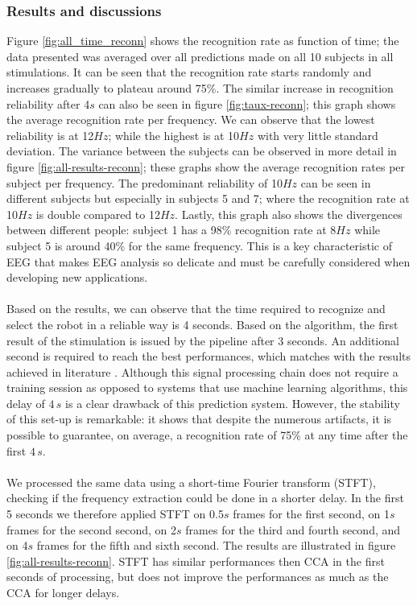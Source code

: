 \documentclass[smallextended]{svjour3}
\begin{document}
\subsubsection{Results and discussions}
Figure \ref{fig:all_time_reconn} shows the recognition rate as function of time; the data presented was averaged over all predictions made on all 10 subjects in all stimulations. It can be seen that the recognition rate starts randomly and increases gradually to plateau around 75\%. The similar increase in recognition reliability after 4$s$ can also be seen in figure \ref{fig:taux-reconn}; this graph shows the average recognition rate per frequency. We can observe that the lowest reliability is at 12$Hz$; while the highest is at 10$Hz$ with very little standard deviation. The variance between the subjects can be observed in more detail in figure \ref{fig:all-results-reconn}; these graphs show the average recognition rates per subject per frequency. The predominant reliability of 10$Hz$ can be seen in different subjects but especially in subjects 5 and 7; where the recognition rate at 10$Hz$ is double compared to 12$Hz$. Lastly, this graph also shows the divergences between different people: subject 1 has a 98\% recognition rate at 8$Hz$ while subject 5 is around 40\% for the same frequency. This is a key characteristic of EEG that makes EEG analysis so delicate and must be carefully considered when developing new applications.\\
\\
Based on the results, we can observe that the time required to recognize and select the robot in a reliable way is 4 seconds. 
Based on the algorithm, the first result of the stimulation is issued by the pipeline after 3 seconds. 
An additional second is required to reach the best performances, which matches with the results achieved in literature \cite{car,SSVEPfiability,jian2014improving,paper4}. 
Although this signal processing chain does not require a training session as opposed to systems that use machine learning algorithms, this delay of $4\,s$ is a clear drawback of this prediction system. 
However, the stability of this set-up is remarkable: it shows that despite the numerous artifacts, it is possible to guarantee, on average, a recognition rate of 75\% at any time after the first $4\,s$. \\
\\
We processed the same data using a short-time Fourier transform (STFT), checking if the frequency extraction could be done in a shorter delay. 
In the first 5 seconds we therefore applied STFT on 0.5$s$ frames for the first second, on 1$s$ frames for the second second, on 2$s$ frames for the third and fourth second, and on 4$s$ frames for the fifth and sixth second. The results are illustrated in figure \ref{fig:all-results-reconn}. STFT has similar performances then CCA in the first seconds of processing, but does not improve the performances as much as the CCA for longer delays.\\
\end{document}
